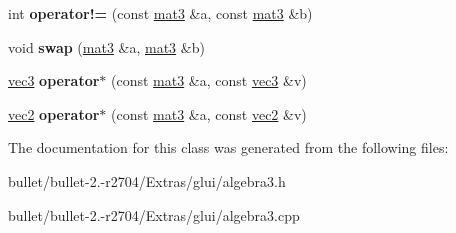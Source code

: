 \begin{DoxyCompactItemize}
\item 
\hypertarget{classmat3_a8716eb2c3905a861aefd96b32f36ded0}{int {\bfseries operator!=} (const \hyperlink{classmat3}{mat3} \&a, const \hyperlink{classmat3}{mat3} \&b)}\label{classmat3_a8716eb2c3905a861aefd96b32f36ded0}

\item 
\hypertarget{classmat3_ac0ca53f4f00e55a17cccd57bd66b29c8}{void {\bfseries swap} (\hyperlink{classmat3}{mat3} \&a, \hyperlink{classmat3}{mat3} \&b)}\label{classmat3_ac0ca53f4f00e55a17cccd57bd66b29c8}

\item 
\hypertarget{classmat3_a46bbeb7eed270ad69b34c3a1b93eb050}{\hyperlink{classvec3}{vec3} {\bfseries operator$\ast$} (const \hyperlink{classmat3}{mat3} \&a, const \hyperlink{classvec3}{vec3} \&v)}\label{classmat3_a46bbeb7eed270ad69b34c3a1b93eb050}

\item 
\hypertarget{classmat3_a307ae299187b6d9e75b1a7730b6213c2}{\hyperlink{classvec2}{vec2} {\bfseries operator$\ast$} (const \hyperlink{classmat3}{mat3} \&a, const \hyperlink{classvec2}{vec2} \&v)}\label{classmat3_a307ae299187b6d9e75b1a7730b6213c2}

\end{DoxyCompactItemize}


The documentation for this class was generated from the following files\+:\begin{DoxyCompactItemize}
\item 
bullet/bullet-\/2.-\/r2704/\+Extras/glui/algebra3.\+h\item 
bullet/bullet-\/2.-\/r2704/\+Extras/glui/algebra3.\+cpp\end{DoxyCompactItemize}
